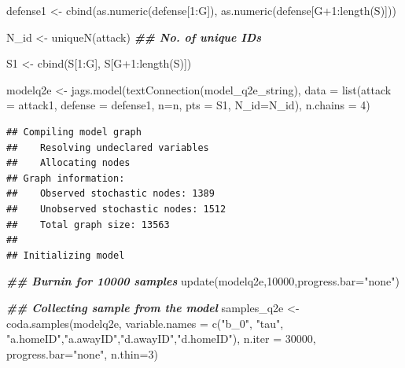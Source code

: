 \documentclass[
]{article}
\newenvironment{Shaded}{\begin{snugshade}}{\end{snugshade}}
\newcommand{\AttributeTok}[1]{\textcolor[rgb]{0.77,0.63,0.00}{#1}}
\newcommand{\DecValTok}[1]{\textcolor[rgb]{0.00,0.00,0.81}{#1}}
\newcommand{\DocumentationTok}[1]{\textcolor[rgb]{0.56,0.35,0.01}{\textbf{\textit{#1}}}}
\newcommand{\FunctionTok}[1]{\textcolor[rgb]{0.00,0.00,0.00}{#1}}
\newcommand{\NormalTok}[1]{#1}
\newcommand{\OtherTok}[1]{\textcolor[rgb]{0.56,0.35,0.01}{#1}}
\newcommand{\SpecialCharTok}[1]{\textcolor[rgb]{0.00,0.00,0.00}{#1}}
\newcommand{\StringTok}[1]{\textcolor[rgb]{0.31,0.60,0.02}{#1}}
\begin{document}
\begin{Shaded}
\begin{Highlighting}[]
\NormalTok{defense1 }\OtherTok{\textless{}{-}} \FunctionTok{cbind}\NormalTok{(}\FunctionTok{as.numeric}\NormalTok{(defense[}\DecValTok{1}\SpecialCharTok{:}\NormalTok{G]), }\FunctionTok{as.numeric}\NormalTok{(defense[G}\SpecialCharTok{+}\DecValTok{1}\SpecialCharTok{:}\FunctionTok{length}\NormalTok{(S)]))}

\NormalTok{N\_id }\OtherTok{\textless{}{-}} \FunctionTok{uniqueN}\NormalTok{(attack) }\DocumentationTok{\#\# No. of unique ID\textquotesingle{}s}

\NormalTok{S1 }\OtherTok{\textless{}{-}} \FunctionTok{cbind}\NormalTok{(S[}\DecValTok{1}\SpecialCharTok{:}\NormalTok{G], S[G}\SpecialCharTok{+}\DecValTok{1}\SpecialCharTok{:}\FunctionTok{length}\NormalTok{(S)])}

\NormalTok{modelq2e }\OtherTok{\textless{}{-}} \FunctionTok{jags.model}\NormalTok{(}\FunctionTok{textConnection}\NormalTok{(model\_q2e\_string), }\AttributeTok{data =} \FunctionTok{list}\NormalTok{(}\AttributeTok{attack =}\NormalTok{ attack1, }\AttributeTok{defense =}\NormalTok{ defense1, }\AttributeTok{n=}\NormalTok{n, }\AttributeTok{pts =}\NormalTok{ S1, }\AttributeTok{N\_id=}\NormalTok{N\_id), }\AttributeTok{n.chains =} \DecValTok{4}\NormalTok{)}
\end{Highlighting}
\end{Shaded}

\begin{verbatim}
## Compiling model graph
##    Resolving undeclared variables
##    Allocating nodes
## Graph information:
##    Observed stochastic nodes: 1389
##    Unobserved stochastic nodes: 1512
##    Total graph size: 13563
## 
## Initializing model
\end{verbatim}

\begin{Shaded}
\begin{Highlighting}[]
\DocumentationTok{\#\# Burnin for 10000 samples}
\FunctionTok{update}\NormalTok{(modelq2e,}\DecValTok{10000}\NormalTok{,}\AttributeTok{progress.bar=}\StringTok{"none"}\NormalTok{)}

\DocumentationTok{\#\# Collecting sample from the model}
\NormalTok{samples\_q2e }\OtherTok{\textless{}{-}} \FunctionTok{coda.samples}\NormalTok{(modelq2e, }\AttributeTok{variable.names =} \FunctionTok{c}\NormalTok{(}\StringTok{"b\_0"}\NormalTok{, }\StringTok{"tau"}\NormalTok{, }\StringTok{"a.homeID"}\NormalTok{,}\StringTok{"a.awayID"}\NormalTok{,}\StringTok{"d.awayID"}\NormalTok{,}\StringTok{"d.homeID"}\NormalTok{), }\AttributeTok{n.iter =} \DecValTok{30000}\NormalTok{, }\AttributeTok{progress.bar=}\StringTok{"none"}\NormalTok{, }\AttributeTok{n.thin=}\DecValTok{3}\NormalTok{)}
\end{Highlighting}
\end{Shaded}
\end{document}
